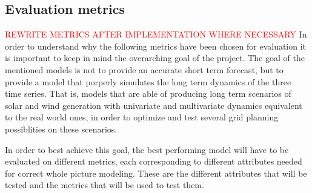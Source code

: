 \subsection{Evaluation metrics}
\label{s:evaluation-metrics}
\textcolor{red}{REWRITE METRICS AFTER IMPLEMENTATION WHERE NECESSARY}
In order to understand why the following metrics have been chosen for evaluation it is important to keep in mind the overarching goal of the project. The goal of the mentioned models is not to provide an accurate short term forecast, but to provide a model that porperly simulates the long term dynamics of the three time series. That is, models that are able of producing long term scenarios of solar and wind generation with univariate and multivariate dynamics equivalent to the real world ones, in order to optimize and test several grid planning possiblities on these scenarios. 

In order to best achieve this goal, the best performing model will have to be evaluated on different metrics, each corresponding to different attributes needed for correct whole picture modeling. These are the different attributes that will be tested and the metrics that will be used to test them. 

